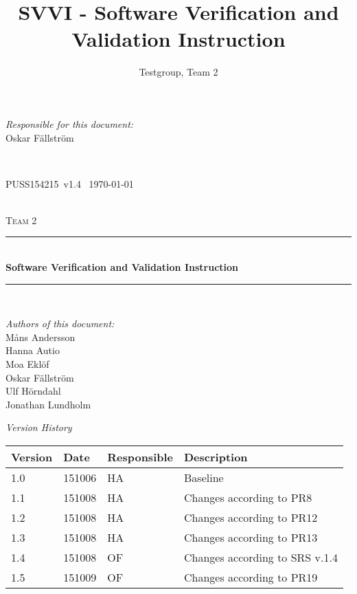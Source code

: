 \documentclass[a4paper]{article}
\title{SVVI - Software Verification and Validation Instruction}
\author{Testgroup, Team 2}
\newcommand{\version}{v1.4}
\newcommand{\SVVI}{PUSS154215}
\begin{document}
\begin{titlepage}
\newcommand{\HRule}{\rule{\linewidth}{0.5mm}}

\begin{minipage}{0.5\textwidth}
\begin{flushleft} %
\textit{Responsible for this document:}\\
Oskar Fällström %
\end{flushleft}
\end{minipage}
~
\begin{minipage}{0.4\textwidth}
\begin{flushright}
\SVVI\ \version\ %
\today
\end{flushright}
\end{minipage}\\[3cm]

\centering
\textsc{\LARGE Team 2}\\[0.5cm]

\HRule \\[0.4cm]
{ \huge \bfseries Software Verification and Validation Instruction}\\[0.4cm] %
\HRule \\[1.5cm]

\vfill
\begin{flushleft}
\textit{Authors of this document:}\\
Måns Andersson \\
Hanna Autio \\
Moa Eklöf \\
Oskar Fällström \\
Ulf Hörndahl \\
Jonathan Lundholm
\end{flushleft}


\end{titlepage}

\begin{center}
\textit{\large Version History}

    \begin{tabular}{ | l | l | l | p{5cm} |}
    \hline
    \textbf{Version}		& \textbf{Date}		& \textbf{Responsible}					& \textbf{Description}					\\ \hline
    1.0						& 151006			& HA									& Baseline								\\ \hline
    1.1						& 151008			& HA									& Changes according to PR8				\\ \hline
    1.2						& 151008			& HA									& Changes according to PR12 		\\ \hline
    1.3						& 151008			& HA									& Changes according to PR13		\\ \hline
    1.4						& 151008			& OF									& Changes according to SRS v.1.4		\\ \hline
    1.5						& 151009			& OF									& Changes according to PR19	\\ \hline
    \end{tabular}
\end{center}
\end{document}
